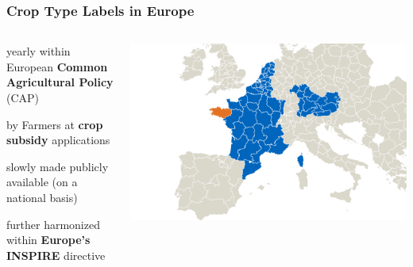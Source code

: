 \documentclass[%
  aspectratio=169,
  9pt,
  USenglish,
  titlegraphic, %
  affiliationintitlepagehead,
  affiliation,
]{beamer}
\begin{document}
\begin{frame}
	\frametitle{Crop Type Labels in Europe}
	
	\begin{columns}
		
	
	\Large
	
	\begin{description}\setlength\itemsep{1em}
		\item[\color{tumblue}collected] yearly within European \textbf{Common Agricultural Policy} (CAP)
		\item[\color{tumblue}declared] by Farmers at \textbf{crop subsidy} applications
		\item[\color{tumblue}today] slowly made publicly available (on a national basis)
		\item[\color{tumblue}in future] further harmonized within \textbf{Europe's INSPIRE} directive
	\end{description}
	
	\includegraphics[width=\textwidth]{images/europe_data2}
	
	
	\end{columns}
\end{frame}
\end{document}
